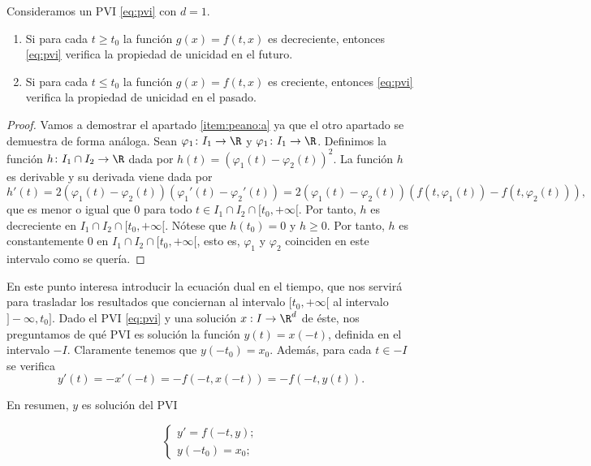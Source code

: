 \documentclass{article}
\begin{document}
\begin{thm} \label{thm:peano} Consideramos un PVI \eqref{eq:pvi} con
  $d = 1$.
  \begin{enumerate}
  \item\label{item:peano:a} Si para cada $t \ge t_0$ la función $g(x) = f(t,x)$ es decreciente,
    entonces \eqref{eq:pvi} verifica la propiedad de unicidad en el futuro.
  \item\label{item:peano:b} Si para cada $t \le t_0$ la función $g(x) = f(t,x)$ es creciente,
    entonces \eqref{eq:pvi} verifica la propiedad de unicidad en el pasado.
  \end{enumerate}
\end{thm}
\begin{proof}
  Vamos a demostrar el apartado \ref{item:peano:a} ya que el otro apartado se demuestra de forma
  análoga. Sean $\varphi_1 \colon I_1 \to \R$ y $\varphi_1 \colon I_1 \to \R$. Definimos la función
  $h \colon I_1 \cap I_2 \to \R$ dada por $h(t) = (\varphi_1(t) - \varphi_2(t))^2$. La función $h$
  es derivable y su derivada viene dada por
  \[ h'(t) = 2(\varphi_1(t) - \varphi_2(t))(\varphi_1'(t) - \varphi_2'(t)) = 2(\varphi_1(t) -
    \varphi_2(t))(f(t, \varphi_1(t)) - f(t, \varphi_2(t))), \] que es menor o igual que $0$ para
  todo $t \in I_1 \cap I_2 \cap [t_0, +\infty[$. Por tanto, $h$ es decreciente en
  $I_1 \cap I_2 \cap [t_0, +\infty[$. Nótese que $h(t_0) = 0$ y $h \ge 0$. Por tanto, $h$ es
  constantemente $0$ en $I_1 \cap I_2 \cap [t_0, +\infty[$, esto es, $\varphi_1$ y $\varphi_2$
  coinciden en este intervalo como se quería.
\end{proof}

En este punto interesa introducir la ecuación dual en el tiempo, que nos servirá para trasladar los
resultados que conciernan al intervalo $[t_0, +\infty[$ al intervalo $]-\infty, t_0]$. Dado el PVI
\eqref{eq:pvi} y una solución $x : I \to \R^d$ de éste, nos preguntamos de qué PVI es solución la
función $y(t) = x(-t)$, definida en el intervalo $-I$. Claramente tenemos que $y(-t_0) =
x_0$. Además, para cada $t \in -I$ se verifica
\[ y'(t) = - x'(-t) = - f(-t, x(-t)) = - f(-t, y(t)).\]

En resumen, $y$ es solución del PVI

\begin{equation}
  \label{eq:pvi:dual}
  \begin{cases}
    y' = f(-t, y); \\
    y(-t_0) = x_0;
  \end{cases}
  \tag{D}
\end{equation}
\end{document}
